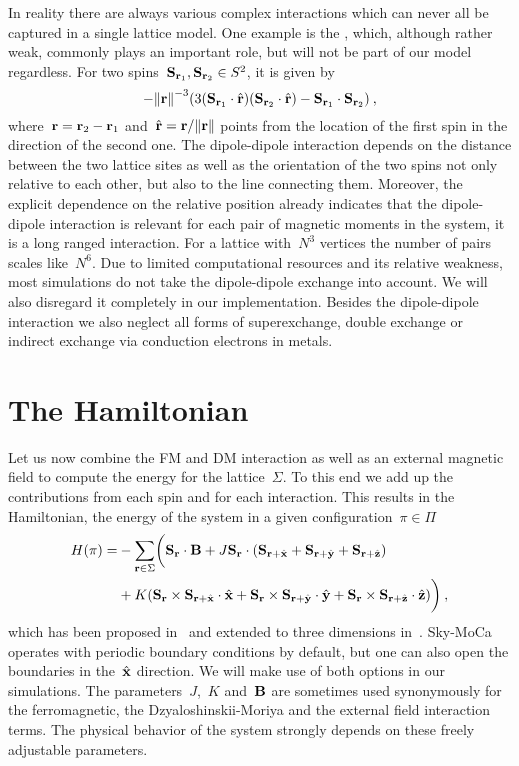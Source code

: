 In reality there are always various complex interactions which can never all be
captured in a single lattice model. One example is the , which, although rather weak, commonly plays an important role, but
will not be part of our model regardless. For two spins~$\mathbf{S}_{\mathbf{r}_1}, \mathbf{S}_{\mathbf{r}_2}
\in S^2$, it is given by
%
\begin{equation}
  - {\norm{\r}^{-3}} (3 (\S_{\r_1} \cdot \hat{\r})
  (\S_{\r_2} \cdot \hat{\r}) - \S_{\r_1} \cdot \S_{\r_2})\:,
\end{equation}
%
where~$\mathbf{r} = \mathbf{r}_2 - \mathbf{r}_1$ and~$\hat{\r} = \r / \norm{\r}$ points from the
location of the first spin in the direction of the second one. The dipole-dipole
interaction depends on the distance between the two lattice sites as well as the
orientation of the two spins not only relative to each other, but also to the
line connecting them. Moreover, the explicit dependence on the relative position
already indicates that the dipole-dipole interaction is relevant for each pair
of magnetic moments in the system, it is a long ranged interaction. For a
lattice with~$N^3$ vertices the number of pairs scales like~$N^6$. Due to
limited computational resources and its relative weakness, most simulations do
not take the dipole-dipole exchange into account. We will also disregard it
completely in our implementation. Besides the dipole-dipole interaction we also
neglect all forms of superexchange, double exchange or indirect exchange via
conduction electrons in metals.
%
\section{The Hamiltonian}\label{sec:hamiltonian}
%

Let us now combine the FM and DM interaction as well as an external magnetic
field to compute the energy for the lattice~$\Sigma$. To this end we add up the
contributions from each spin and for each interaction. This results in the
Hamiltonian, \ie{} the energy of the system in a given configuration~$\pi \in
\Pi$
%
\begin{align}\label{hamiltonian}
  H(\pi) = &-\sum_{\mathbf{r} \in \Sigma}\biggl(\mathbf{S}_{\mathbf{r}} \cdot \mathbf{B} +
      J \mathbf{S}_{\mathbf{r}} \cdot (\mathbf{S}_{\mathbf{r}+\hat{\mathbf{x}}} + \mathbf{S}_{\mathbf{r}+\hat{\mathbf{y}}} + \mathbf{S}_{\mathbf{r}+\hat{\mathbf{z}}})\nonumber \\
      &+ K (\mathbf{S}_{\mathbf{r}} \times \mathbf{S}_{\mathbf{r}+\hat{\mathbf{x}}} \cdot \hat{\mathbf{x}} +
            \mathbf{S}_{\mathbf{r}} \times \mathbf{S}_{\mathbf{r}+\hat{\mathbf{y}}} \cdot \hat{\mathbf{y}} +
            \mathbf{S}_{\mathbf{r}} \times \mathbf{S}_{\mathbf{r}+\hat{\mathbf{z}}} \cdot \hat{\mathbf{z}})\biggr)\:,
\end{align}
%
which has been proposed in~\cite{skyrm13} and extended to three dimensions
in~\cite{skyrmion}. Sky-MoCa operates with periodic boundary conditions by
default, but one can also open the boundaries in the~$\hat{\mathbf{x}}$ direction. We will
make use of both options in our simulations. The parameters~$J$,~$K$ and~$\mathbf{B}$
are sometimes used synonymously for the ferromagnetic, the Dzyaloshinskii-Moriya
and the external field interaction terms. The physical behavior of the system
strongly depends on these freely adjustable parameters.

